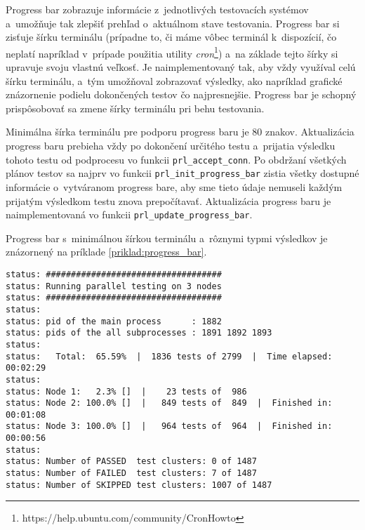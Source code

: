 Progress bar zobrazuje informácie z~jednotlivých testovacích systémov 
a~umožňuje tak zlepšiť prehľad o~aktuálnom stave testovania. 
Progress bar si zisťuje šírku terminálu (prípadne to, či máme vôbec 
terminál k~dispozícií, čo neplatí napríklad v~prípade použitia utility 
\textit{cron}\footnote{https://help.ubuntu.com/community/CronHowto}) 
a~na základe tejto šírky si upravuje svoju vlastnú veľkosť.
Je naimplementovaný tak, aby vždy využíval celú šírku terminálu, a~tým
umožňoval zobrazovať výsledky, ako napríklad grafické znázornenie podielu
dokončených testov čo najpresnejšie. Progress bar je schopný prispôsobovať
sa zmene šírky terminálu pri behu testovania.

Minimálna šírka terminálu pre podporu progress baru je 80 znakov.
Aktualizácia progress baru prebieha vždy po dokončení určitého testu
a~prijatia výsledku tohoto testu od podprocesu vo funkcii
\texttt{prl\_accept\_conn}. Po obdržaní všetkých plánov testov sa najprv 
vo funkcii \texttt{prl\_init\_progress\_bar} zistia všetky dostupné
informácie o~vytváranom progress bare, aby sme tieto údaje nemuseli 
každým prijatým výsledkom testu znova prepočítavať.
Aktualizácia progress baru je naimplementovaná vo funkcii 
\texttt{prl\_update\_progress\_bar}.

Progress bar s~minimálnou šírkou terminálu a~rôznymi 
typmi výsledkov je znázornený na príklade
\ref{priklad:progress_bar}.

\noindent\begin{minipage}{\textwidth}
\begin{lstlisting}[caption=Ukážka progress baru so šírkou terminálu 
80 znakov,label=priklad:progress_bar]
status: ###################################
status: Running parallel testing on 3 nodes
status: ###################################
status: 
status: pid of the main process      : 1882
status: pids of the all subprocesses : 1891 1892 1893
status: 
status:   Total:  65.59%  |  1836 tests of 2799  |  Time elapsed: 00:02:29      
status:                                                                         
status: Node 1:   2.3% []  |    23 tests of  986                                
status: Node 2: 100.0% []  |   849 tests of  849  |  Finished in: 00:01:08      
status: Node 3: 100.0% []  |   964 tests of  964  |  Finished in: 00:00:56      
status:                                                                         
status: Number of PASSED  test clusters: 0 of 1487                              
status: Number of FAILED  test clusters: 7 of 1487                              
status: Number of SKIPPED test clusters: 1007 of 1487
\end{lstlisting}
\end{minipage}



